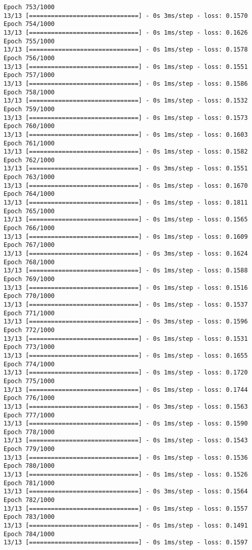 \documentclass[11pt]{article}
\begin{document}
\begin{Verbatim}[commandchars=\\\{\}]
Epoch 753/1000
13/13 [==============================] - 0s 3ms/step - loss: 0.1570
Epoch 754/1000
13/13 [==============================] - 0s 1ms/step - loss: 0.1626
Epoch 755/1000
13/13 [==============================] - 0s 1ms/step - loss: 0.1578
Epoch 756/1000
13/13 [==============================] - 0s 1ms/step - loss: 0.1551
Epoch 757/1000
13/13 [==============================] - 0s 1ms/step - loss: 0.1586
Epoch 758/1000
13/13 [==============================] - 0s 1ms/step - loss: 0.1532
Epoch 759/1000
13/13 [==============================] - 0s 1ms/step - loss: 0.1573
Epoch 760/1000
13/13 [==============================] - 0s 1ms/step - loss: 0.1603
Epoch 761/1000
13/13 [==============================] - 0s 1ms/step - loss: 0.1582
Epoch 762/1000
13/13 [==============================] - 0s 3ms/step - loss: 0.1551
Epoch 763/1000
13/13 [==============================] - 0s 1ms/step - loss: 0.1670
Epoch 764/1000
13/13 [==============================] - 0s 1ms/step - loss: 0.1811
Epoch 765/1000
13/13 [==============================] - 0s 1ms/step - loss: 0.1565
Epoch 766/1000
13/13 [==============================] - 0s 1ms/step - loss: 0.1609
Epoch 767/1000
13/13 [==============================] - 0s 3ms/step - loss: 0.1624
Epoch 768/1000
13/13 [==============================] - 0s 1ms/step - loss: 0.1588
Epoch 769/1000
13/13 [==============================] - 0s 1ms/step - loss: 0.1516
Epoch 770/1000
13/13 [==============================] - 0s 1ms/step - loss: 0.1537
Epoch 771/1000
13/13 [==============================] - 0s 3ms/step - loss: 0.1596
Epoch 772/1000
13/13 [==============================] - 0s 1ms/step - loss: 0.1531
Epoch 773/1000
13/13 [==============================] - 0s 1ms/step - loss: 0.1655
Epoch 774/1000
13/13 [==============================] - 0s 1ms/step - loss: 0.1720
Epoch 775/1000
13/13 [==============================] - 0s 1ms/step - loss: 0.1744
Epoch 776/1000
13/13 [==============================] - 0s 3ms/step - loss: 0.1563
Epoch 777/1000
13/13 [==============================] - 0s 1ms/step - loss: 0.1590
Epoch 778/1000
13/13 [==============================] - 0s 1ms/step - loss: 0.1543
Epoch 779/1000
13/13 [==============================] - 0s 1ms/step - loss: 0.1536
Epoch 780/1000
13/13 [==============================] - 0s 1ms/step - loss: 0.1526
Epoch 781/1000
13/13 [==============================] - 0s 3ms/step - loss: 0.1564
Epoch 782/1000
13/13 [==============================] - 0s 1ms/step - loss: 0.1557
Epoch 783/1000
13/13 [==============================] - 0s 1ms/step - loss: 0.1491
Epoch 784/1000
13/13 [==============================] - 0s 1ms/step - loss: 0.1597

\end{Verbatim}
\end{document}

